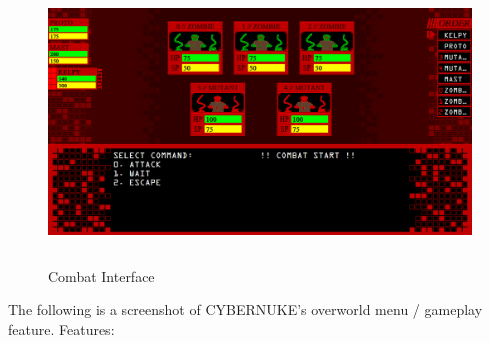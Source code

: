 \documentclass[10pt,conference,onecolumn,compsoc]{IEEEtran}
\begin{document}
\begin{figure}[ht!]
\centering
\includegraphics[height=281.25px, width=500px]{Mockups/CYBERNUKE_COMBAT_SCREENSHOT.png}
\caption{Combat Interface}
\label{combat_mockup}
\end{figure}

\pagebreak
The following is a screenshot of CYBERNUKE's overworld menu / gameplay feature.
Features:
\end{document}
